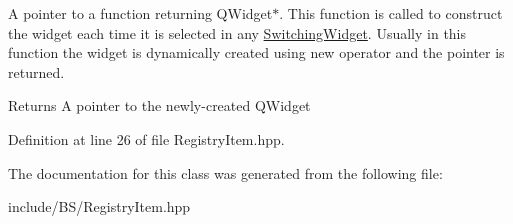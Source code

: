 A pointer to a function returning Q\+Widget$\ast$. This function is called to construct the widget each time it is selected in any \hyperlink{class_switching_widget}{Switching\+Widget}. Usually in this function the widget is dynamically created using {\ttfamily new} operator and the pointer is returned. \begin{DoxyReturn}{Returns}
A pointer to the newly-\/created Q\+Widget 
\end{DoxyReturn}


Definition at line 26 of file Registry\+Item.\+hpp.



The documentation for this class was generated from the following file\+:\begin{DoxyCompactItemize}
\item 
include/\+B\+S/Registry\+Item.\+hpp\end{DoxyCompactItemize}
